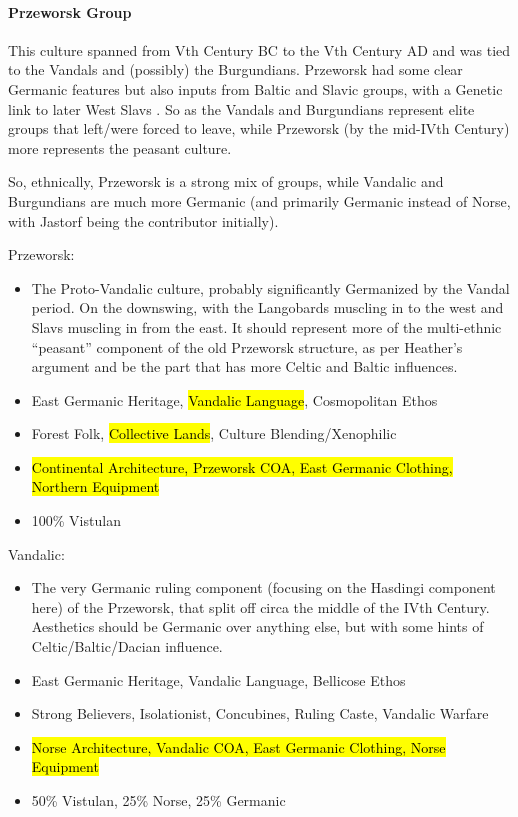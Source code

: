 \documentclass{article}
\begin{document}
	\paragraph{Przeworsk Group}
	This culture spanned from Vth Century BC to the Vth Century AD and was tied to the Vandals and (possibly) the Burgundians.
	Przeworsk had some clear Germanic features but also inputs from Baltic and Slavic groups, with a Genetic link to later West Slavs \cite{SlavGenomes}.
	So as the Vandals and Burgundians represent elite groups that left/were forced to leave, while Przeworsk (by the mid-IVth Century) more represents the peasant culture.
	
	So, ethnically, Przeworsk is a strong mix of groups, while Vandalic and Burgundians are much more Germanic (and primarily Germanic instead of Norse, with Jastorf being the contributor initially).
	
	Przeworsk:
	\begin{itemize}
		\item The Proto-Vandalic culture, probably significantly Germanized by the Vandal period. On the downswing, with the Langobards muscling in to the west and Slavs muscling in from the east.
		It should represent more of the multi-ethnic “peasant” component of the old Przeworsk structure, as per Heather’s argument and be the part that has more Celtic and Baltic influences.
		\item East Germanic Heritage, \hl{Vandalic Language}, Cosmopolitan Ethos
		\item Forest Folk, \hl{Collective Lands}, Culture Blending/Xenophilic
		\item \hl{Continental Architecture, Przeworsk COA, East Germanic Clothing, Northern Equipment}
		\item 100\% Vistulan
	\end{itemize}
	
	Vandalic:
	\begin{itemize}
		\item The very Germanic ruling component (focusing on the Hasdingi component here) of the Przeworsk, that split off circa the middle of the IVth Century.
		Aesthetics should be Germanic over anything else, but with some hints of Celtic/Baltic/Dacian influence.
		\item East Germanic Heritage, Vandalic Language, Bellicose Ethos
		\item Strong Believers, Isolationist, Concubines, Ruling Caste, Vandalic Warfare
		\item \hl{Norse Architecture, Vandalic COA, East Germanic Clothing, Norse Equipment}
		\item 50\% Vistulan, 25\% Norse, 25\% Germanic
	\end{itemize}
	
\end{document}

